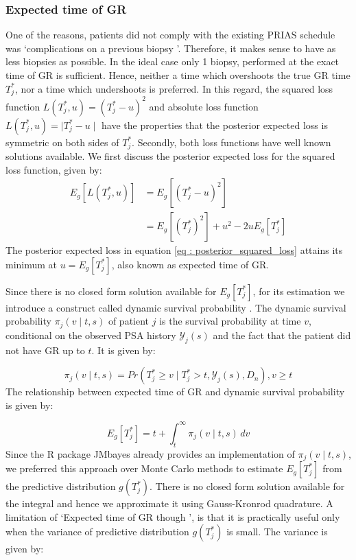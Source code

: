 \subsubsection{Expected time of GR}
\label{subsubsec : exp_fail_time}
One of the reasons, patients did not comply with the existing PRIAS schedule was \textquoteleft complications on a previous biopsy \textquoteright. Therefore, it makes sense to have as less biopsies as possible. In the ideal case only 1 biopsy, performed at the exact time of GR is sufficient. Hence, neither a time which overshoots the true GR time $T^*_j$, nor a time which undershoots is preferred. In this regard, the squared loss function $L(T^*_j, u) = (T^*_j - u)^2$ and absolute loss function $L(T^*_j, u) = \mid T^*_j - u \mid$ have the properties that the posterior expected loss is symmetric on both sides of $T^*_j$. Secondly, both loss functions have well known solutions available. We first discuss the posterior expected loss for the squared loss function, given by:
\begin{equation}
\label{eq : posterior_squared_loss}
\begin{split}
E_g[L(T^*_j, u)] &= E_g[(T^*_j - u)^2]\\
&=E_g[(T^*_j)^2] + u^2 -2uE_g[T^*_j]
\end{split}
\end{equation}
The posterior expected loss in equation \ref{eq : posterior_squared_loss} attains its minimum at $u = E_g[T^*_j]$, also known as expected time of GR.

Since there is no closed form solution available for $E_g[T^*_j]$, for its estimation we introduce a construct called dynamic survival probability \citep{rizopoulos2011dynamic}. The dynamic survival probability $\pi_j(v \mid t, s)$ of patient $j$ is the survival probability at time $v$, conditional on the observed PSA history $\mathcal{Y}_j(s)$ and the fact that the patient did not have GR up to $t$. It is given by:

\begin{equation}
\pi_j(v \mid t, s) = Pr(T^*_j \geq v \mid  T^*_j >t, \mathcal{Y}_j(s), D_n), v \geq t
\end{equation}
The relationship between expected time of GR and dynamic survival probability is given by:

\begin{equation*}
E_g[T^*_j] = t + \int_t^\infty \pi_j(v \mid t, s) \,dv
\end{equation*}
Since the R package JMbayes already provides an implementation of $\pi_j(v \mid t, s)$, we preferred this approach over Monte Carlo methods to estimate $E_g[T^*_j]$ from the predictive distribution $g(T^*_j)$. There is no closed form solution available for the integral and hence we approximate it using Gauss-Kronrod quadrature. A limitation of \textquoteleft Expected time of GR though \textquoteright, is that it is practically useful only when the variance of predictive distribution $g(T^*_j)$ is small. The variance is given by:

